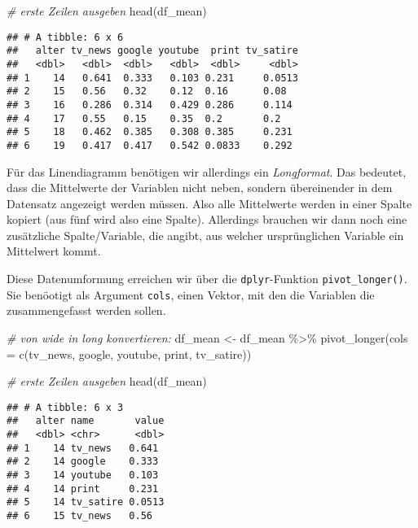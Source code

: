 \documentclass[
]{book}
\newenvironment{Shaded}{\begin{snugshade}}{\end{snugshade}}
\newcommand{\AttributeTok}[1]{\textcolor[rgb]{0.77,0.63,0.00}{#1}}
\newcommand{\CommentTok}[1]{\textcolor[rgb]{0.56,0.35,0.01}{\textit{#1}}}
\newcommand{\FunctionTok}[1]{\textcolor[rgb]{0.00,0.00,0.00}{#1}}
\newcommand{\NormalTok}[1]{#1}
\newcommand{\OtherTok}[1]{\textcolor[rgb]{0.56,0.35,0.01}{#1}}
\newcommand{\SpecialCharTok}[1]{\textcolor[rgb]{0.00,0.00,0.00}{#1}}
\begin{document}
\begin{Shaded}
\begin{Highlighting}[]
\CommentTok{\# erste Zeilen ausgeben}
\FunctionTok{head}\NormalTok{(df\_mean)}
\end{Highlighting}
\end{Shaded}

\begin{verbatim}
## # A tibble: 6 x 6
##   alter tv_news google youtube  print tv_satire
##   <dbl>   <dbl>  <dbl>   <dbl>  <dbl>     <dbl>
## 1    14   0.641  0.333   0.103 0.231     0.0513
## 2    15   0.56   0.32    0.12  0.16      0.08  
## 3    16   0.286  0.314   0.429 0.286     0.114 
## 4    17   0.55   0.15    0.35  0.2       0.2   
## 5    18   0.462  0.385   0.308 0.385     0.231 
## 6    19   0.417  0.417   0.542 0.0833    0.292
\end{verbatim}

Für das Linendiagramm benötigen wir allerdings ein \emph{Longformat}. Das bedeutet, dass die Mittelwerte der Variablen nicht neben, sondern übereinender in dem Datensatz angezeigt werden müssen. Also alle Mittelwerte werden in einer Spalte kopiert (aus fünf wird also eine Spalte). Allerdings brauchen wir dann noch eine zusätzliche Spalte/Variable, die angibt, aus welcher ursprünglichen Variable ein Mittelwert kommt.

Diese Datenumformung erreichen wir über die \texttt{dplyr}-Funktion \texttt{pivot\_longer()}. Sie benöotigt als Argument \texttt{cols}, einen Vektor, mit den die Variablen die zusammengefasst werden sollen.

\begin{Shaded}
\begin{Highlighting}[]
\CommentTok{\# von wide in long konvertieren:}
\NormalTok{df\_mean }\OtherTok{\textless{}{-}}\NormalTok{ df\_mean }\SpecialCharTok{\%\textgreater{}\%} 
  \FunctionTok{pivot\_longer}\NormalTok{(}\AttributeTok{cols =} \FunctionTok{c}\NormalTok{(tv\_news, google, youtube, print, tv\_satire))}

\CommentTok{\# erste Zeilen ausgeben}
\FunctionTok{head}\NormalTok{(df\_mean)}
\end{Highlighting}
\end{Shaded}

\begin{verbatim}
## # A tibble: 6 x 3
##   alter name       value
##   <dbl> <chr>      <dbl>
## 1    14 tv_news   0.641 
## 2    14 google    0.333 
## 3    14 youtube   0.103 
## 4    14 print     0.231 
## 5    14 tv_satire 0.0513
## 6    15 tv_news   0.56
\end{verbatim}
\end{document}
